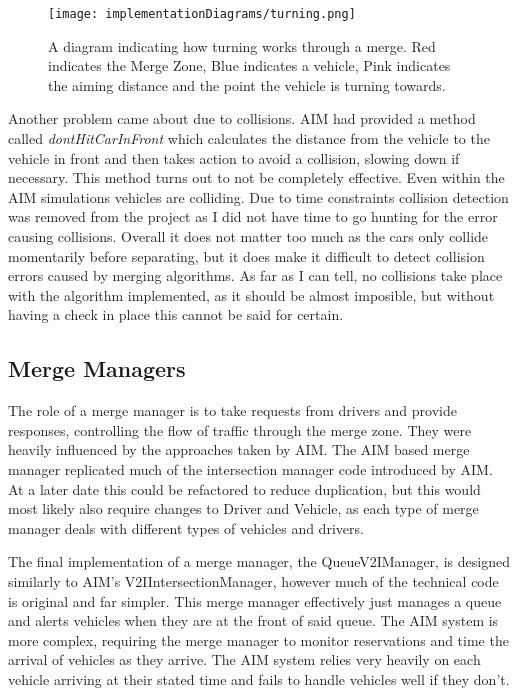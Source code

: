 \begin{figure}[htb]
\texttt{[image: implementationDiagrams/turning.png]}
\caption{A diagram indicating how turning works through a merge. Red indicates the Merge Zone, Blue indicates a vehicle, Pink indicates the aiming distance and the point the vehicle is turning towards.}
\label{fig:turning}
\end{figure}

Another problem came about due to collisions. AIM had provided a method called \emph{dontHitCarInFront} which calculates the distance from the vehicle to the vehicle in front and then takes action to avoid a collision, slowing down if necessary. This method turns out to not be completely effective. Even within the AIM simulations vehicles are colliding. Due to time constraints collision detection was removed from the project as I did not have time to go hunting for the error causing collisions. Overall it does not matter too much as the cars only collide momentarily before separating, but it does make it difficult to detect collision errors caused by merging algorithms. As far as I can tell, no collisions take place with the algorithm implemented, as it should be almost imposible, but without having a check in place this cannot be said for certain.

\subsection{Merge Managers}
\label{subsec:Merge Managers}
The role of a merge manager is to take requests from drivers and provide responses, controlling the flow of traffic through the merge zone. They were heavily influenced by the approaches taken by AIM. The AIM based merge manager replicated much of the intersection manager code introduced by AIM. At a later date this could be refactored to reduce duplication, but this would most likely also require changes to Driver and Vehicle, as each type of merge manager deals with different types of vehicles and drivers.

The final implementation of a merge manager, the QueueV2IManager, is designed similarly to AIM's V2IIntersectionManager, however much of the technical code is original and far simpler. This merge manager effectively just manages a queue and alerts vehicles when they are at the front of said queue. The AIM system is more complex, requiring the merge manager to monitor reservations and time the arrival of vehicles as they arrive. The AIM system relies very heavily on each vehicle arriving at their stated time and fails to handle vehicles well if they don't.

